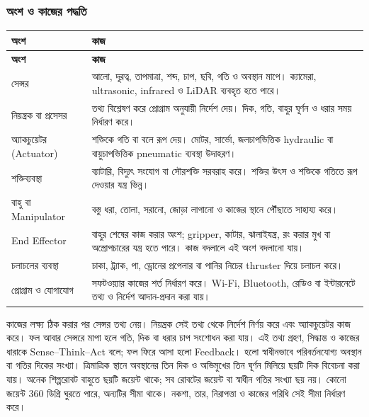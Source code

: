 \subsubsection{অংশ ও কাজের পদ্ধতি}
\begin{compacttable}
\begin{longtable}{|p{}|p{}|}
\hline\textbf{অংশ} & \textbf{কাজ}\\\hline\endfirsthead
\hline\textbf{অংশ} & \textbf{কাজ}\\\hline\endhead
সেন্সর & আলো, দূরত্ব, তাপমাত্রা, শব্দ, চাপ, ছবি, গতি ও অবস্থান মাপে। ক্যামেরা, ultrasonic, infrared ও LiDAR ব্যবহৃত হতে পারে।\\\hline
নিয়ন্ত্রক বা প্রসেসর & তথ্য বিশ্লেষণ করে প্রোগ্রাম অনুযায়ী নির্দেশ দেয়। দিক, গতি, বাহুর ঘূর্ণন ও ধরার সময় নির্ধারণ করে।\\\hline
অ্যাকচুয়েটর (Actuator) & শক্তিকে গতি বা বলে রূপ দেয়। মোটর, সার্ভো, জলচাপভিত্তিক hydraulic বা বায়ুচাপভিত্তিক pneumatic ব্যবস্থা উদাহরণ।\\\hline
শক্তিব্যবস্থা & ব্যাটারি, বিদ্যুৎ সংযোগ বা সৌরশক্তি সরবরাহ করে। শক্তির উৎস ও শক্তিকে গতিতে রূপ দেওয়ার যন্ত্র ভিন্ন।\\\hline
বাহু বা Manipulator & বস্তু ধরা, তোলা, সরানো, জোড়া লাগানো ও কাজের স্থানে পৌঁছাতে সাহায্য করে।\\\hline
End Effector & বাহুর শেষের কাজ করার অংশ; gripper, কাটার, ঝালাইযন্ত্র, রং করার মুখ বা অস্ত্রোপচারের যন্ত্র হতে পারে। কাজ বদলালে এই অংশ বদলানো যায়।\\\hline
চলাচলের ব্যবস্থা & চাকা, ট্র্যাক, পা, ড্রোনের প্রপেলার বা পানির নিচের thruster দিয়ে চলাচল করে।\\\hline
প্রোগ্রাম ও যোগাযোগ & সফটওয়্যার কাজের শর্ত নির্ধারণ করে। Wi-Fi, Bluetooth, রেডিও বা ইন্টারনেটে তথ্য ও নির্দেশ আদান-প্রদান করা যায়।\\\hline
\end{longtable}
\end{compacttable}
কাজের লক্ষ্য ঠিক করার পর সেন্সর তথ্য নেয়। নিয়ন্ত্রক সেই তথ্য থেকে নির্দেশ নির্ণয় করে এবং অ্যাকচুয়েটর কাজ করে। ফল আবার সেন্সরে মাপা হলে গতি, দিক বা ধরার চাপ সংশোধন করা যায়। এই তথ্য গ্রহণ, সিদ্ধান্ত ও কাজের ধারাকে Sense--Think--Act বলে; ফল ফিরে আসা হলো Feedback।
 হলো স্বাধীনভাবে পরিবর্তনযোগ্য অবস্থান বা গতির দিকের সংখ্যা। ত্রিমাত্রিক স্থানে অবস্থানের তিন দিক ও অভিমুখের তিন ঘূর্ণন মিলিয়ে ছয়টি দিক বিবেচনা করা যায়। অনেক শিল্পরোবট বাহুতে ছয়টি জয়েন্ট থাকে; সব রোবটের জয়েন্ট বা স্বাধীন গতির সংখ্যা ছয় নয়। কোনো জয়েন্ট 360 ডিগ্রি ঘুরতে পারে, অন্যটির সীমা থাকে। নকশা, তার, নিরাপত্তা ও কাজের পরিধি সেই সীমা নির্ধারণ করে।
